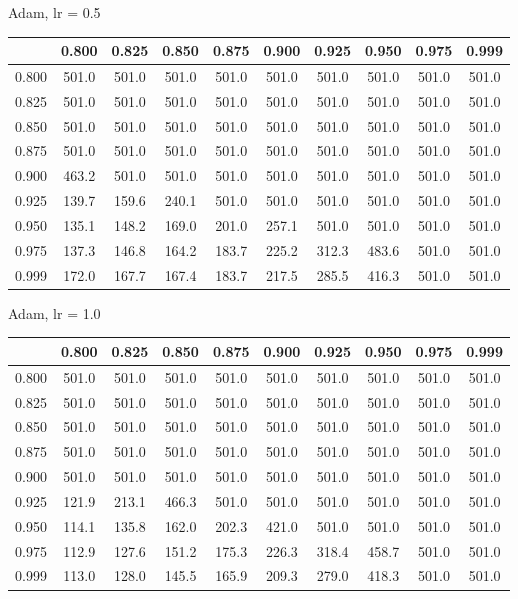 \documentclass[a4paper,14pt,oneside,openany]{memoir}
\begin{document}
	Adam, lr = 0.5 
	
	\begin{tabular}{|c|c|c|c|c|c|c|c|c|c|}
	\hline 
	 &0.800 &0.825 &0.850 &0.875 &0.900 &0.925 &0.950 &0.975 &0.999 \\
	 \hline 
	0.800 &501.0 &501.0 &501.0 &501.0 &501.0 &501.0 &501.0 &501.0 &501.0 \\
	 \hline 
	0.825 &501.0 &501.0 &501.0 &501.0 &501.0 &501.0 &501.0 &501.0 &501.0 \\
	 \hline 
	0.850 &501.0 &501.0 &501.0 &501.0 &501.0 &501.0 &501.0 &501.0 &501.0 \\
	 \hline 
	0.875 &501.0 &501.0 &501.0 &501.0 &501.0 &501.0 &501.0 &501.0 &501.0 \\
	 \hline 
	0.900 &463.2 &501.0 &501.0 &501.0 &501.0 &501.0 &501.0 &501.0 &501.0 \\
	 \hline 
	0.925 &139.7 &159.6 &240.1 &501.0 &501.0 &501.0 &501.0 &501.0 &501.0 \\
	 \hline 
	0.950 &135.1 &148.2 &169.0 &201.0 &257.1 &501.0 &501.0 &501.0 &501.0 \\
	 \hline 
	0.975 &137.3 &146.8 &164.2 &183.7 &225.2 &312.3 &483.6 &501.0 &501.0 \\
	 \hline 
	0.999 &172.0 &167.7 &167.4 &183.7 &217.5 &285.5 &416.3 &501.0 &501.0 \\
	 \hline 
	
	\end{tabular}
	
	Adam, lr = 1.0 
	
	\begin{tabular}{|c|c|c|c|c|c|c|c|c|c|}
	\hline 
	 &0.800 &0.825 &0.850 &0.875 &0.900 &0.925 &0.950 &0.975 &0.999 \\
	 \hline 
	0.800 &501.0 &501.0 &501.0 &501.0 &501.0 &501.0 &501.0 &501.0 &501.0 \\
	 \hline 
	0.825 &501.0 &501.0 &501.0 &501.0 &501.0 &501.0 &501.0 &501.0 &501.0 \\
	 \hline 
	0.850 &501.0 &501.0 &501.0 &501.0 &501.0 &501.0 &501.0 &501.0 &501.0 \\
	 \hline 
	0.875 &501.0 &501.0 &501.0 &501.0 &501.0 &501.0 &501.0 &501.0 &501.0 \\
	 \hline 
	0.900 &501.0 &501.0 &501.0 &501.0 &501.0 &501.0 &501.0 &501.0 &501.0 \\
	 \hline 
	0.925 &121.9 &213.1 &466.3 &501.0 &501.0 &501.0 &501.0 &501.0 &501.0 \\
	 \hline 
	0.950 &114.1 &135.8 &162.0 &202.3 &421.0 &501.0 &501.0 &501.0 &501.0 \\
	 \hline 
	0.975 &112.9 &127.6 &151.2 &175.3 &226.3 &318.4 &458.7 &501.0 &501.0 \\
	 \hline 
	0.999 &113.0 &128.0 &145.5 &165.9 &209.3 &279.0 &418.3 &501.0 &501.0 \\
	 \hline 
	
	\end{tabular}
	
\end{document}
